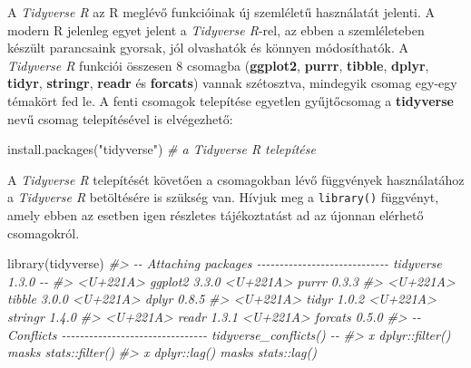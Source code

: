 \documentclass[
]{book}
\newenvironment{Shaded}{\begin{snugshade}}{\end{snugshade}}
\newcommand{\CommentTok}[1]{\textcolor[rgb]{0.56,0.35,0.01}{\textit{#1}}}
\newcommand{\FunctionTok}[1]{\textcolor[rgb]{0.00,0.00,0.00}{#1}}
\newcommand{\NormalTok}[1]{#1}
\newcommand{\StringTok}[1]{\textcolor[rgb]{0.31,0.60,0.02}{#1}}
\begin{document}
A \emph{Tidyverse R} az R meglévő funkcióinak új szemléletű használatát jelenti. A modern R jelenleg egyet jelent a \emph{Tidyverse R}-rel, az ebben a szemléleteben készült parancsaink gyorsak, jól olvashatók és könnyen módosíthatók. A \emph{Tidyverse R} funkciói összesen 8 csomagba (\textbf{ggplot2}, \textbf{purrr}, \textbf{tibble}, \textbf{dplyr}, \textbf{tidyr}, \textbf{stringr}, \textbf{readr} és \textbf{forcats}) vannak szétosztva, mindegyik csomag egy-egy témakört fed le. A fenti csomagok telepítése egyetlen gyűjtőcsomag a \textbf{tidyverse} nevű csomag telepítésével is elvégezhető:

\begin{Shaded}
\begin{Highlighting}[]
\FunctionTok{install.packages}\NormalTok{(}\StringTok{"tidyverse"}\NormalTok{) }\CommentTok{\# a Tidyverse R telepítése}
\end{Highlighting}
\end{Shaded}

A \emph{Tidyverse R} telepítését követően a csomagokban lévő függvények használatához a \emph{Tidyverse R} betöltésére is szükség van. Hívjuk meg a \texttt{library()} függvényt, amely ebben az esetben igen részletes tájékoztatást ad az újonnan elérhető csomagokról.

\begin{Shaded}
\begin{Highlighting}[]
\FunctionTok{library}\NormalTok{(tidyverse)}
\CommentTok{\#\textgreater{} {-}{-} Attaching packages {-}{-}{-}{-}{-}{-}{-}{-}{-}{-}{-}{-}{-}{-}{-}{-}{-}{-}{-}{-}{-}{-}{-}{-}{-}{-}{-}{-}{-} tidyverse 1.3.0 {-}{-}}
\CommentTok{\#\textgreater{} \textless{}U+221A\textgreater{} ggplot2 3.3.0     \textless{}U+221A\textgreater{} purrr   0.3.3}
\CommentTok{\#\textgreater{} \textless{}U+221A\textgreater{} tibble  3.0.0     \textless{}U+221A\textgreater{} dplyr   0.8.5}
\CommentTok{\#\textgreater{} \textless{}U+221A\textgreater{} tidyr   1.0.2     \textless{}U+221A\textgreater{} stringr 1.4.0}
\CommentTok{\#\textgreater{} \textless{}U+221A\textgreater{} readr   1.3.1     \textless{}U+221A\textgreater{} forcats 0.5.0}
\CommentTok{\#\textgreater{} {-}{-} Conflicts {-}{-}{-}{-}{-}{-}{-}{-}{-}{-}{-}{-}{-}{-}{-}{-}{-}{-}{-}{-}{-}{-}{-}{-}{-}{-}{-}{-}{-}{-}{-}{-} tidyverse\_conflicts() {-}{-}}
\CommentTok{\#\textgreater{} x dplyr::filter() masks stats::filter()}
\CommentTok{\#\textgreater{} x dplyr::lag()    masks stats::lag()}
\end{Highlighting}
\end{Shaded}
\end{document}
